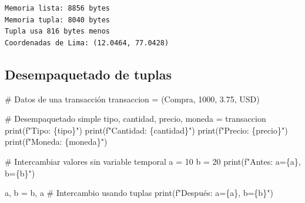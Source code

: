 \documentclass[
  doc,
  floatsintext,
  longtable,
  a4paper,
  nolmodern,
  notxfonts,
  notimes,
  12pt,
  colorlinks=true,linkcolor=blue,citecolor=blue,urlcolor=blue]{apa7}
\newenvironment{Shaded}{\begin{snugshade}}{\end{snugshade}}
\newcommand{\BuiltInTok}[1]{\textcolor[rgb]{0.00,0.23,0.31}{#1}}
\newcommand{\CommentTok}[1]{\textcolor[rgb]{0.37,0.37,0.37}{#1}}
\newcommand{\DecValTok}[1]{\textcolor[rgb]{0.68,0.00,0.00}{#1}}
\newcommand{\FloatTok}[1]{\textcolor[rgb]{0.68,0.00,0.00}{#1}}
\newcommand{\NormalTok}[1]{\textcolor[rgb]{0.00,0.23,0.31}{#1}}
\newcommand{\OperatorTok}[1]{\textcolor[rgb]{0.37,0.37,0.37}{#1}}
\newcommand{\SpecialCharTok}[1]{\textcolor[rgb]{0.37,0.37,0.37}{#1}}
\newcommand{\SpecialStringTok}[1]{\textcolor[rgb]{0.13,0.47,0.30}{#1}}
\newcommand{\StringTok}[1]{\textcolor[rgb]{0.13,0.47,0.30}{#1}}
\begin{document}
\begin{verbatim}
Memoria lista: 8856 bytes
Memoria tupla: 8040 bytes
Tupla usa 816 bytes menos
Coordenadas de Lima: (12.0464, 77.0428)
\end{verbatim}

\subsection{Desempaquetado de tuplas}\label{desempaquetado-de-tuplas}

\begin{Shaded}
\begin{Highlighting}[]
\CommentTok{\# Datos de una transacción}
\NormalTok{transaccion }\OperatorTok{=}\NormalTok{ (}\StringTok{\textquotesingle{}Compra\textquotesingle{}}\NormalTok{, }\DecValTok{1000}\NormalTok{, }\FloatTok{3.75}\NormalTok{, }\StringTok{\textquotesingle{}USD\textquotesingle{}}\NormalTok{)}

\CommentTok{\# Desempaquetado simple}
\NormalTok{tipo, cantidad, precio, moneda }\OperatorTok{=}\NormalTok{ transaccion}
\BuiltInTok{print}\NormalTok{(}\SpecialStringTok{f"Tipo: }\SpecialCharTok{\{}\NormalTok{tipo}\SpecialCharTok{\}}\SpecialStringTok{"}\NormalTok{)}
\BuiltInTok{print}\NormalTok{(}\SpecialStringTok{f"Cantidad: }\SpecialCharTok{\{}\NormalTok{cantidad}\SpecialCharTok{\}}\SpecialStringTok{"}\NormalTok{)}
\BuiltInTok{print}\NormalTok{(}\SpecialStringTok{f"Precio: }\SpecialCharTok{\{}\NormalTok{precio}\SpecialCharTok{\}}\SpecialStringTok{"}\NormalTok{)}
\BuiltInTok{print}\NormalTok{(}\SpecialStringTok{f"Moneda: }\SpecialCharTok{\{}\NormalTok{moneda}\SpecialCharTok{\}}\SpecialStringTok{"}\NormalTok{)}

\CommentTok{\# Intercambiar valores sin variable temporal}
\NormalTok{a }\OperatorTok{=} \DecValTok{10}
\NormalTok{b }\OperatorTok{=} \DecValTok{20}
\BuiltInTok{print}\NormalTok{(}\SpecialStringTok{f"Antes: a=}\SpecialCharTok{\{}\NormalTok{a}\SpecialCharTok{\}}\SpecialStringTok{, b=}\SpecialCharTok{\{}\NormalTok{b}\SpecialCharTok{\}}\SpecialStringTok{"}\NormalTok{)}

\NormalTok{a, b }\OperatorTok{=}\NormalTok{ b, a  }\CommentTok{\# Intercambio usando tuplas}
\BuiltInTok{print}\NormalTok{(}\SpecialStringTok{f"Después: a=}\SpecialCharTok{\{}\NormalTok{a}\SpecialCharTok{\}}\SpecialStringTok{, b=}\SpecialCharTok{\{}\NormalTok{b}\SpecialCharTok{\}}\SpecialStringTok{"}\NormalTok{)}


\end{Highlighting}
\end{Shaded}
\end{document}
